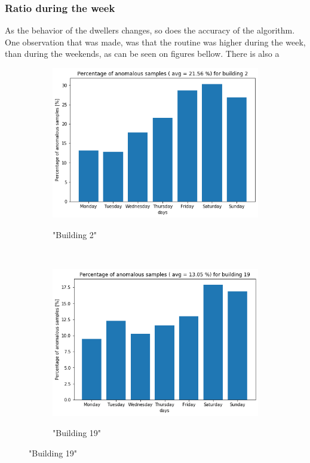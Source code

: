 \subsubsection{Ratio during the week}

As the behavior of the dwellers changes, so does the accuracy of the algorithm. 
One observation that was made, was that the routine was higher during the week, than during the weekends,
as can be seen on figures bellow. There is also a 

\begin{figure}[H]
	\begin{subfigure}{.5\textwidth}
		\caption{"Building 2"}
		\includegraphics[width=1\linewidth]{../Figures/EC/b2week.png}
		\label{fig:ec_b2week}
	\end{subfigure}%
	~ 
	\begin{subfigure}{.5\textwidth}
		\caption{"Building 19"}
		\includegraphics[width=1\linewidth]{../Figures/EC/b19week.png}
		\label{fig:ec_b5week}
	\end{subfigure}%
    \bigskip


\end{figure}
